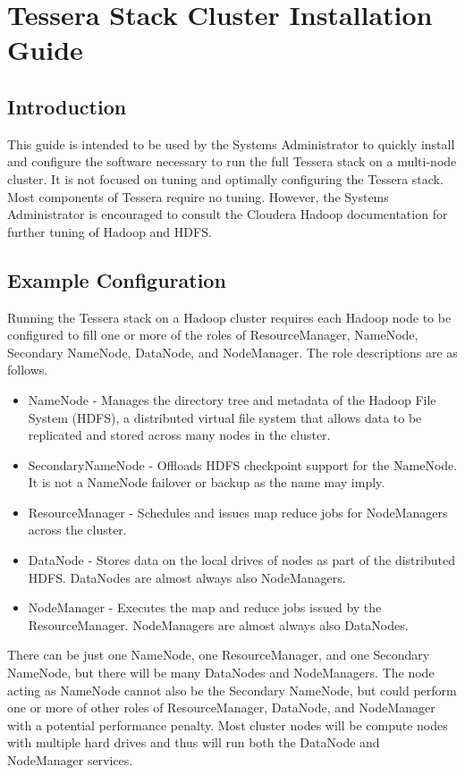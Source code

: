 \section{Tessera Stack Cluster Installation Guide}
\subsection{Introduction}
This guide is intended to be used by the Systems Administrator to quickly
install and configure the software necessary to run the full Tessera
stack on a multi-node cluster.  It is not focused on tuning and optimally
configuring the Tessera stack.  Most components of Tessera require no
tuning.  However, the Systems Administrator is encouraged to consult the
Cloudera Hadoop documentation for further tuning of Hadoop and HDFS.


\subsection{Example Configuration}
Running the Tessera stack on a Hadoop cluster requires each Hadoop node to be configured to fill one or more of the roles of ResourceManager, NameNode, Secondary NameNode, DataNode, and NodeManager. The role descriptions are as follows.

\begin{itemize}
\item NameNode - Manages the directory tree and metadata of the Hadoop File System (HDFS), a distributed virtual file system that allows data to be replicated and stored across many nodes in the cluster. 
\item SecondaryNameNode - Offloads HDFS checkpoint support for the NameNode.  It is not a NameNode failover or backup as the name may imply.
\item ResourceManager - Schedules and issues map reduce jobs for NodeManagers across the cluster.
\item DataNode - Stores data on the local drives of nodes as part of the distributed HDFS.  DataNodes are almost always also NodeManagers.
\item NodeManager - Executes the map and reduce jobs issued by the ResourceManager. NodeManagers are almost always also DataNodes.
\end{itemize}

There can be just one NameNode, one ResourceManager, and one Secondary
NameNode, but there will be many DataNodes and NodeManagers.  The node
acting as NameNode cannot also be the Secondary NameNode, but could
perform one or more of other roles of ResourceManager, DataNode, and
NodeManager with a potential  performance penalty.  Most cluster nodes
will be compute nodes with multiple hard drives and thus will run both
the DataNode and NodeManager services.

